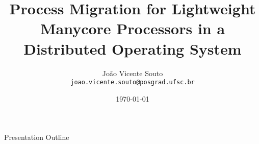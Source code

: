\documentclass[english]{lapesd-slides}
\title[Process Migration for LW Processors in a Distributed OS]{
	Process Migration for Lightweight Manycore Processors in a Distributed Operating System
}
\author[J. V. Souto]{
	\large João Vicente Souto\\
	{\small \texttt{joao.vicente.souto@posgrad.ufsc.br}}
}
\institute{
	\fontsize{10.5}{12.6}\selectfont 
	Parallel Computing - Computer Science\\
	INE/UFSC, Florianópolis\\
}
\date{\today}
\begin{document}
\titleframe

\begin{frame}{Presentation Outline}
  \tableofcontents
\end{frame}

\showsections









\thanksframe

\end{document}
